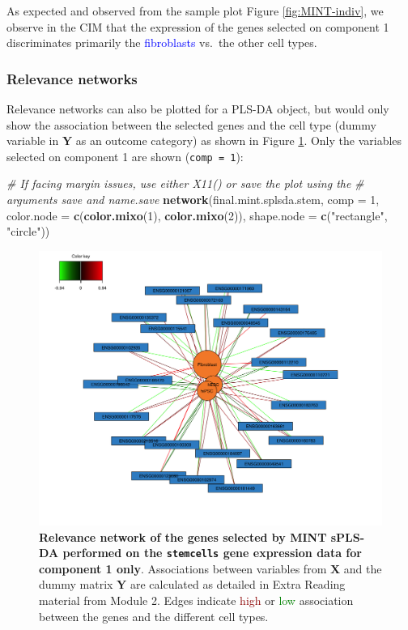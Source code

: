 \documentclass[]{book}
\newenvironment{Shaded}{\begin{snugshade}}{\end{snugshade}}
\newcommand{\CommentTok}[1]{\textcolor[rgb]{0.56,0.35,0.01}{\textit{#1}}}
\newcommand{\DataTypeTok}[1]{\textcolor[rgb]{0.13,0.29,0.53}{#1}}
\newcommand{\DecValTok}[1]{\textcolor[rgb]{0.00,0.00,0.81}{#1}}
\newcommand{\KeywordTok}[1]{\textcolor[rgb]{0.13,0.29,0.53}{\textbf{#1}}}
\newcommand{\NormalTok}[1]{#1}
\newcommand{\StringTok}[1]{\textcolor[rgb]{0.31,0.60,0.02}{#1}}
\begin{document}
As expected and observed from the sample plot Figure \ref{fig:MINT-indiv}, we observe in the CIM that the expression of the genes selected on component 1 discriminates primarily the \textcolor{blue}{fibroblasts} vs.~the other cell types.

\hypertarget{relevance-networks}{%
\subsubsection{Relevance networks}\label{relevance-networks}}

Relevance networks can also be plotted for a PLS-DA object, but would only show the association between the selected genes and the cell type (dummy variable in \(\boldsymbol Y\) as an outcome category) as shown in Figure \ref{fig:MINT-network}. Only the variables selected on component 1 are shown (\texttt{comp\ =\ 1}):

\begin{Shaded}
\begin{Highlighting}[]
\CommentTok{# If facing margin issues, use either X11() or save the plot using the}
\CommentTok{# arguments save and name.save}
\KeywordTok{network}\NormalTok{(final.mint.splsda.stem, }\DataTypeTok{comp =} \DecValTok{1}\NormalTok{,}
        \DataTypeTok{color.node =} \KeywordTok{c}\NormalTok{(}\KeywordTok{color.mixo}\NormalTok{(}\DecValTok{1}\NormalTok{), }\KeywordTok{color.mixo}\NormalTok{(}\DecValTok{2}\NormalTok{)), }
        \DataTypeTok{shape.node =} \KeywordTok{c}\NormalTok{(}\StringTok{"rectangle"}\NormalTok{, }\StringTok{"circle"}\NormalTok{))}
\end{Highlighting}
\end{Shaded}

\begin{figure}

{\centering \includegraphics[width=0.5\linewidth]{Figures/MINT/MINT-network-1} 

}

\caption{\textbf{Relevance network of the genes selected by MINT sPLS-DA performed on the \texttt{stemcells} gene expression data for component 1 only}. Associations between variables from \(\boldsymbol X\) and the dummy matrix \(\boldsymbol Y\) are calculated as detailed in Extra Reading material from Module 2. Edges indicate \textcolor{darkred}{high} or \textcolor{green}{low} association between the genes and the different cell types.}\label{fig:MINT-network}
\end{figure}
\end{document}
